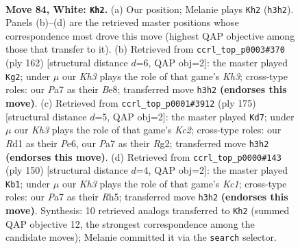 \documentclass[11pt]{article}
\begin{document}
\clearpage

\begin{figure}[p]\centering
\begin{subfigure}{0.46\textwidth}\centering
\resizebox{\linewidth}{!}{%
\newchessgame
\chessboard[
  setfen={5r1k/P7/8/8/8/7K/8/3R4 w - - 37 84},
  showmover=false,
  pgfstyle=straightmove, color=movearrow, markmove={h3-h2}
]}
\caption{}
\end{subfigure}\hfill
\begin{subfigure}{0.46\textwidth}\centering
\resizebox{\linewidth}{!}{%
\newchessgame
\chessboard[
  setfen={4B3/8/5r2/8/5k2/7K/8/8 w - - 1 82},
  showmover=false,
  pgfstyle=straightmove, color=movearrow, markmove={h3-g2}
]}
\caption{}
\end{subfigure}
\\[4pt]
\begin{subfigure}{0.46\textwidth}\centering
\resizebox{\linewidth}{!}{%
\newchessgame
\chessboard[
  setfen={8/2k5/4p3/8/5P2/3K4/6r1/3R4 b - - 4 88},
  showmover=false,
  pgfstyle=straightmove, color=movearrow, markmove={c7-d7}
]}
\caption{}
\end{subfigure}\hfill
\begin{subfigure}{0.46\textwidth}\centering
\resizebox{\linewidth}{!}{%
\newchessgame
\chessboard[
  setfen={3k4/8/3r4/7R/8/8/8/2K5 w - - 21 76},
  showmover=false,
  pgfstyle=straightmove, color=movearrow, markmove={c1-b1}
]}
\caption{}
\end{subfigure}
\caption{\textbf{Move 84, White: \texttt{Kh2}.} (a) Our position; Melanie plays \texttt{Kh2} (\texttt{h3h2}). Panels (b)--(d) are the retrieved master positions whose correspondence most drove this move (highest QAP objective among those that transfer to it). (b) Retrieved from \texttt{ccrl\_top\_p0003\#370} (ply 162) [structural distance $d$=6, QAP obj=2]: the master played \texttt{Kg2}; under $\mu$ our \emph{Kh3} plays the role of that game's \emph{Kh3}; cross-type roles: our \emph{P}a7 as their \emph{B}e8; transferred move \texttt{h3h2} \textbf{(endorses this move)}. (c) Retrieved from \texttt{ccrl\_top\_p0001\#3912} (ply 175) [structural distance $d$=5, QAP obj=2]: the master played \texttt{Kd7}; under $\mu$ our \emph{Kh3} plays the role of that game's \emph{Kc2}; cross-type roles: our \emph{R}d1 as their \emph{P}e6, our \emph{P}a7 as their \emph{R}g2; transferred move \texttt{h3h2} \textbf{(endorses this move)}. (d) Retrieved from \texttt{ccrl\_top\_p0000\#143} (ply 150) [structural distance $d$=4, QAP obj=2]: the master played \texttt{Kb1}; under $\mu$ our \emph{Kh3} plays the role of that game's \emph{Kc1}; cross-type roles: our \emph{P}a7 as their \emph{R}h5; transferred move \texttt{h3h2} \textbf{(endorses this move)}. Synthesis: 10 retrieved analogs transferred to \texttt{Kh2} (summed QAP objective 12, the strongest correspondence among the candidate moves); Melanie committed it via the \texttt{search} selector.}
\label{fig:thought-m166}
\end{figure}
\end{document}
